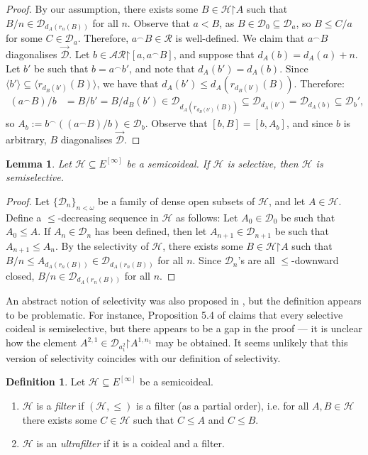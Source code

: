 \documentclass[11pt,reqno]{amsart}
\theoremstyle{plain}
\numberwithin{equation}{section}
\newtheorem{lemma}[theorem]{Lemma}
\theoremstyle{definition}
\newtheorem{definition}[theorem]{Definition}
\renewcommand{\c}[1]{\langle #1 \rangle}
\newcommand{\cal}{\mathcal}
\newcommand{\restrictedto}{\mathord{\upharpoonright}}
\renewcommand{\H}{\cal{H}}
\newcommand{\D}{\cal{D}}
\begin{document}
\begin{proof}
    By our assumption, there exists some $B \in \H\restrictedto A$ such that $B/n \in \D_{d_A(r_n(B))}$ for all $n$. Observe that $a < B$, as $B \in \D_0 \subseteq \D_a$, so $B \leq C/a$ for some $C \in \D_a$. Therefore, $a^\frown B \in \cal{R}$ is well-defined. We claim that $a^\frown B$ diagonalises $\vec{\D}$. Let $b \in \cal{AR}\restrictedto[a,a^\frown B]$, and suppose that $d_A(b) = d_A(a) + n$. Let $b'$ be such that $b = a^\frown b'$, and note that $d_A(b') = d_A(b)$. Since $\c{b'} \subseteq \c{r_{d_B(b')}(B)}$, we have that $d_A(b') \leq d_A(r_{d_B(b')}(B))$. Therefore:
    \begin{align*}
        (a^\frown B)/b &= B/b' = B/d_B(b') \in \D_{d_A(r_{d_B(b')}(B))} \subseteq \D_{d_A(b')} = \D_{d_A(b)} \subseteq \D_b',
    \end{align*}
    so $A_b := b^\frown((a^\frown B)/b) \in \D_b$. Observe that $[b,B] = [b,A_b]$, and since $b$ is arbitrary, $B$ diagonalises $\vec{\D}$.
\end{proof}

\begin{lemma}
    Let $\H \subseteq E^{[\infty]}$ be a semicoideal. If $\H$ is selective, then $\H$ is semiselective.
\end{lemma}

\begin{proof}
    Let $\{\D_n\}_{n<\omega}$ be a family of dense open subsets of $\H$, and let $A \in \H$. Define a $\leq$-decreasing sequence in $\H$ as follows: Let $A_0 \in \D_0$ be such that $A_0 \leq A$. If $A_n \in \D_n$ has been defined, then let $A_{n+1} \in \D_{n+1}$ be such that $A_{n+1} \leq A_n$. By the selectivity of $\H$, there exists some $B \in \H\restrictedto A$ such that $B/n \leq A_{d_A(r_n(B))} \in \D_{d_A(r_n(B))}$ for all $n$. Since $\D_n$'s are all $\leq$-downward closed, $B/n \in \D_{d_A(r_n(B))}$ for all $n$.
\end{proof}

An abstract notion of selectivity was also proposed in \cite{DMN15}, but the definition appears to be problematic. For instance, Proposition 5.4 of \cite{DMN15} claims that every selective coideal is semiselective, but there appears to be a gap in the proof --- it is unclear how the element $A^{2,1} \in \D_{a_1^2}\restrictedto A^{1,n_1}$ may be obtained. It seems unlikely that this version of selectivity coincides with our definition of selectivity.

\begin{definition}
\label{def:filter}
    Let $\H \subseteq E^{[\infty]}$ be a semicoideal. 
    \begin{enumerate}
        \item $\H$ is a \emph{filter} if $(\H,\leq)$ is a filter (as a partial order), i.e. for all $A,B \in \H$ there exists some $C \in \H$ such that $C \leq A$ and $C \leq B$. 
            
        \item $\H$ is an \emph{ultrafilter} if it is a coideal and a filter.
    \end{enumerate}
\end{definition}
\end{document}
